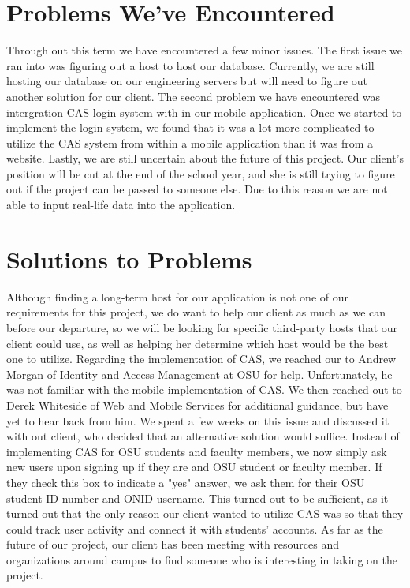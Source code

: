 \documentclass[onecolumn, draftclsnofoot,10pt, compsoc]{IEEEtran}
\begin{document}
\section{Problems We've Encountered}
  Through out this term we have encountered a few minor issues. The first issue we ran into was figuring out a host to host our database. Currently, we are still hosting our database on our engineering servers but will need to figure out another solution for our client. The second problem we have encountered was intergration CAS login system with in our mobile application. Once we started to implement the login system, we found that it was a lot more complicated to utilize the CAS system from within a mobile application than it was from a website. Lastly, we are still uncertain about the future of this project. Our client's position will be cut at the end of the school year, and she is still trying to figure out if the project can be passed to someone else. Due to this reason we are not able to input real-life data into the application.

\section{Solutions to Problems}
  Although finding a long-term host for our application is not one of our requirements for this project, we do want to help our client as much as we can before our departure, so we will be looking for specific third-party hosts that our client could use, as well as helping her determine which host would be the best one to utilize. Regarding the implementation of CAS, we reached our to Andrew Morgan of Identity and Access Management at OSU for help. Unfortunately, he was not familiar with the mobile implementation of CAS. We then reached out to Derek Whiteside of Web and Mobile Services for additional guidance, but have yet to hear back from him. We spent a few weeks on this issue and discussed it with out client, who decided that an alternative solution would suffice. Instead of implementing CAS for OSU students and faculty members, we now simply ask new users upon signing up if they are and OSU student or faculty member. If they check this box to indicate a "yes" answer, we ask them for their OSU student ID number and ONID username. This turned out to be sufficient, as it turned out that the only reason our client wanted to utilize CAS was so that they could track user activity and connect it with students' accounts. As far as the future of our project, our client has been meeting with resources and organizations around campus to find someone who is interesting in taking on the project.
\end{document}
